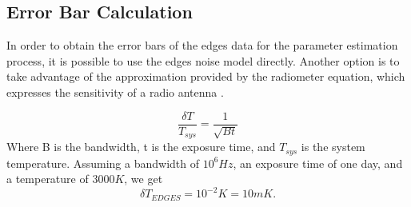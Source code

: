 \documentclass[12pt, TexShade, letterpaper]{report}
\begin{document}
\subsection{Error Bar Calculation}
\label{chap:results,sub:edges,subsub:error}
In order to obtain the error bars of the \gls{edges} data for the parameter estimation process, it is possible to use the \gls{edges} noise model directly. Another option is to take advantage of the approximation provided by the radiometer equation, which expresses the sensitivity of a radio antenna \cite{sensitivity_1, sensitivity_2}.\par
\begin{equation}
    \frac{\delta T}{T_{sys}} = \frac{1}{\sqrt{Bt}}
\end{equation}
Where B is the bandwidth, t is the exposure time, and $T_{sys}$ is the system temperature. Assuming a bandwidth of $10^6Hz$, an exposure time of one day, and a temperature of $3000K$, we get
\begin{equation}
   \delta T_{EDGES} = 10 ^{-2}K = 10mK. 
\end{equation}
\end{document}
